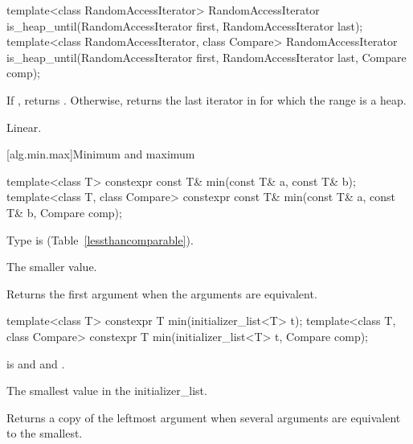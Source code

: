 \begin{itemdescr}
\pnum
\returns {}
\end{itemdescr}

%
\begin{itemdecl}
template<class RandomAccessIterator>
  RandomAccessIterator is_heap_until(RandomAccessIterator first, RandomAccessIterator last);
template<class RandomAccessIterator, class Compare>
  RandomAccessIterator is_heap_until(RandomAccessIterator first, RandomAccessIterator last,
    Compare comp);
\end{itemdecl}


\begin{itemdescr}
\pnum
\returns If , returns
. Otherwise, returns
the last iterator  in  for which the
range  is a heap.

\pnum
\complexity Linear.
\end{itemdescr}


[alg.min.max]{Minimum and maximum}

%
\begin{itemdecl}
template<class T> constexpr const T& min(const T& a, const T& b);
template<class T, class Compare>
  constexpr const T& min(const T& a, const T& b, Compare comp);
\end{itemdecl}

\begin{itemdescr}
\pnum
\requires
Type
is
 (Table~\ref{lessthancomparable}).

\pnum
\returns
The smaller value.

\pnum
\notes
Returns the first argument when the arguments are equivalent.
\end{itemdescr}

%
\begin{itemdecl}
template<class T>
  constexpr T min(initializer_list<T> t);
template<class T, class Compare>
  constexpr T min(initializer_list<T> t, Compare comp);
\end{itemdecl}

\begin{itemdescr}
\pnum
\requires {} is  and  and
.

\pnum
\returns The smallest value in the initializer_list.

\pnum
\remarks Returns a copy of the leftmost argument when several arguments are equivalent to the smallest.\
\end{itemdescr}

